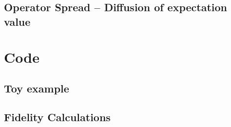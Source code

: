 \documentclass[11pt, oneside, listof=totoc]{scrbook}
\begin{document}
\begin{figure}[H]
    \centering
    \resizebox{\textwidth}{!}{}
\end{figure}


\section{Operator Spread -- Diffusion of expectation value}


\appendix




\chapter{Code}\label{appendix:code}

\section{Toy example}








\section{Fidelity Calculations}


\backmatter\printbibliography[heading=bibintoc, title=Bibliography]
\end{document}
